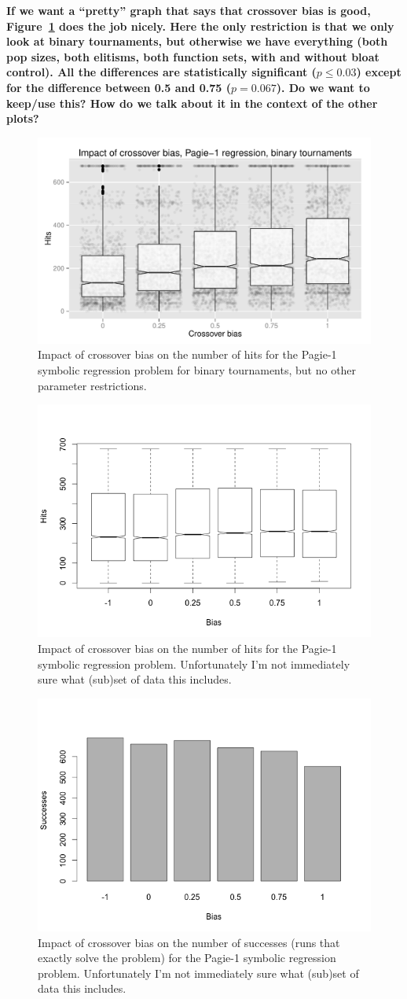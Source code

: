\documentclass{sig-alternate}
\begin{document}
\textbf{If we want a ``pretty'' graph that says that crossover bias is good, 
Figure~\ref{fig:Pagie1Hits_Binary_tournaments} does the job nicely. Here the only restriction is that we only look at binary 
tournaments, but otherwise we have everything (both pop sizes, both elitisms, both function sets, with and without 
bloat control). All the differences are statistically significant ($p \leq 0.03$) except for the difference between 0.5 and 
0.75 ($p=0.067$). Do we want to keep/use this? How do we talk about it in the context of the other plots?}

\begin{figure}
\centering
\includegraphics[width=0.45 \textwidth]{Plots/Pagie_1_Hits_binary_tournaments.pdf}
\caption{Impact of crossover bias on the number of hits for the Pagie-1 symbolic regression problem for binary 
tournaments, but no other parameter restrictions.}
\label{fig:Pagie1Hits_Binary_tournaments}
\end{figure}


\begin{figure}
\centering
\includegraphics[width=0.45 \textwidth]{Plots/Pagie-1_Hits_vs_Bias.png}
\caption{Impact of crossover bias on the number of hits for the Pagie-1 symbolic regression problem. 
Unfortunately I'm not immediately sure what (sub)set of data this includes.}
\label{fig:Pagie1Hits}
\end{figure}

\begin{figure}
\centering
\includegraphics[width=0.45 \textwidth]{Plots/Pagie-1_Successes_vs_Bias.png}
\caption{Impact of crossover bias on the number of successes (runs that exactly solve the problem) for the 
Pagie-1 symbolic regression problem. Unfortunately I'm not immediately sure what (sub)set of data this 
includes.}
\label{fig:Pagie1Successes}
\end{figure}
\end{document}
